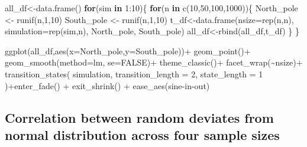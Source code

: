 \documentclass[
  letterpaper,
  DIV=11,
  numbers=noendperiod]{scrreprt}
\newenvironment{Shaded}{\begin{snugshade}}{\end{snugshade}}
\newcommand{\AttributeTok}[1]{\textcolor[rgb]{0.40,0.45,0.13}{#1}}
\newcommand{\ConstantTok}[1]{\textcolor[rgb]{0.56,0.35,0.01}{#1}}
\newcommand{\ControlFlowTok}[1]{\textcolor[rgb]{0.00,0.23,0.31}{\textbf{#1}}}
\newcommand{\DecValTok}[1]{\textcolor[rgb]{0.68,0.00,0.00}{#1}}
\newcommand{\FunctionTok}[1]{\textcolor[rgb]{0.28,0.35,0.67}{#1}}
\newcommand{\NormalTok}[1]{\textcolor[rgb]{0.00,0.23,0.31}{#1}}
\newcommand{\OtherTok}[1]{\textcolor[rgb]{0.00,0.23,0.31}{#1}}
\newcommand{\SpecialCharTok}[1]{\textcolor[rgb]{0.37,0.37,0.37}{#1}}
\newcommand{\StringTok}[1]{\textcolor[rgb]{0.13,0.47,0.30}{#1}}
\begin{document}
\begin{Shaded}
\begin{Highlighting}[]
\NormalTok{all\_df}\OtherTok{\textless{}{-}}\FunctionTok{data.frame}\NormalTok{()}
\ControlFlowTok{for}\NormalTok{(sim }\ControlFlowTok{in} \DecValTok{1}\SpecialCharTok{:}\DecValTok{10}\NormalTok{)\{}
  \ControlFlowTok{for}\NormalTok{(n }\ControlFlowTok{in} \FunctionTok{c}\NormalTok{(}\DecValTok{10}\NormalTok{,}\DecValTok{50}\NormalTok{,}\DecValTok{100}\NormalTok{,}\DecValTok{1000}\NormalTok{))\{}
\NormalTok{  North\_pole }\OtherTok{\textless{}{-}} \FunctionTok{runif}\NormalTok{(n,}\DecValTok{1}\NormalTok{,}\DecValTok{10}\NormalTok{)}
\NormalTok{  South\_pole }\OtherTok{\textless{}{-}} \FunctionTok{runif}\NormalTok{(n,}\DecValTok{1}\NormalTok{,}\DecValTok{10}\NormalTok{)}
\NormalTok{  t\_df}\OtherTok{\textless{}{-}}\FunctionTok{data.frame}\NormalTok{(}\AttributeTok{nsize=}\FunctionTok{rep}\NormalTok{(n,n),}
                   \AttributeTok{simulation=}\FunctionTok{rep}\NormalTok{(sim,n),}
\NormalTok{                                  North\_pole,}
\NormalTok{                                  South\_pole)}
\NormalTok{  all\_df}\OtherTok{\textless{}{-}}\FunctionTok{rbind}\NormalTok{(all\_df,t\_df)}
\NormalTok{  \}}
\NormalTok{\}}


\FunctionTok{ggplot}\NormalTok{(all\_df,}\FunctionTok{aes}\NormalTok{(}\AttributeTok{x=}\NormalTok{North\_pole,}\AttributeTok{y=}\NormalTok{South\_pole))}\SpecialCharTok{+}
  \FunctionTok{geom\_point}\NormalTok{()}\SpecialCharTok{+}
  \FunctionTok{geom\_smooth}\NormalTok{(}\AttributeTok{method=}\NormalTok{lm, }\AttributeTok{se=}\ConstantTok{FALSE}\NormalTok{)}\SpecialCharTok{+}
  \FunctionTok{theme\_classic}\NormalTok{()}\SpecialCharTok{+}
  \FunctionTok{facet\_wrap}\NormalTok{(}\SpecialCharTok{\textasciitilde{}}\NormalTok{nsize)}\SpecialCharTok{+}
  \FunctionTok{transition\_states}\NormalTok{(}
\NormalTok{    simulation,}
    \AttributeTok{transition\_length =} \DecValTok{2}\NormalTok{,}
    \AttributeTok{state\_length =} \DecValTok{1}
\NormalTok{  )}\SpecialCharTok{+}\FunctionTok{enter\_fade}\NormalTok{() }\SpecialCharTok{+} 
  \FunctionTok{exit\_shrink}\NormalTok{() }\SpecialCharTok{+}
  \FunctionTok{ease\_aes}\NormalTok{(}\StringTok{\textquotesingle{}sine{-}in{-}out\textquotesingle{}}\NormalTok{)}
\end{Highlighting}
\end{Shaded}

\subsection{Correlation between random deviates from normal distribution
across four sample
sizes}\label{correlation-between-random-deviates-from-normal-distribution-across-four-sample-sizes}
\end{document}
